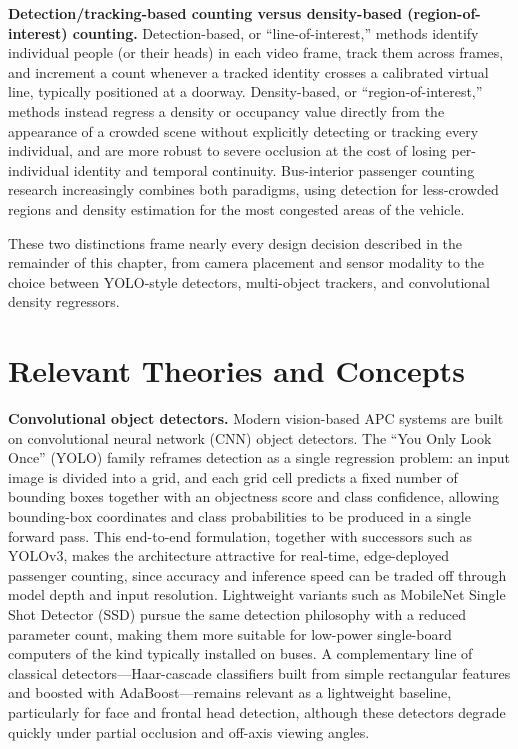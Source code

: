\documentclass[12pt,a4paper]{report}
\begin{document}
\textbf{Detection/tracking-based counting versus density-based (region-of-interest) counting.} Detection-based, or ``line-of-interest,'' methods identify individual people (or their heads) in each video frame, track them across frames, and increment a count whenever a tracked identity crosses a calibrated virtual line, typically positioned at a doorway. Density-based, or ``region-of-interest,'' methods instead regress a density or occupancy value directly from the appearance of a crowded scene without explicitly detecting or tracking every individual, and are more robust to severe occlusion at the cost of losing per-individual identity and temporal continuity. Bus-interior passenger counting research increasingly combines both paradigms, using detection for less-crowded regions and density estimation for the most congested areas of the vehicle.

These two distinctions frame nearly every design decision described in the remainder of this chapter, from camera placement and sensor modality to the choice between YOLO-style detectors, multi-object trackers, and convolutional density regressors.

\section{Relevant Theories and Concepts}

\textbf{Convolutional object detectors.} Modern vision-based APC systems are built on convolutional neural network (CNN) object detectors. The ``You Only Look Once'' (YOLO) family reframes detection as a single regression problem: an input image is divided into a grid, and each grid cell predicts a fixed number of bounding boxes together with an objectness score and class confidence, allowing bounding-box coordinates and class probabilities to be produced in a single forward pass. This end-to-end formulation, together with successors such as YOLOv3, makes the architecture attractive for real-time, edge-deployed passenger counting, since accuracy and inference speed can be traded off through model depth and input resolution. Lightweight variants such as MobileNet Single Shot Detector (SSD) pursue the same detection philosophy with a reduced parameter count, making them more suitable for low-power single-board computers of the kind typically installed on buses. A complementary line of classical detectors---Haar-cascade classifiers built from simple rectangular features and boosted with AdaBoost---remains relevant as a lightweight baseline, particularly for face and frontal head detection, although these detectors degrade quickly under partial occlusion and off-axis viewing angles.
\end{document}
